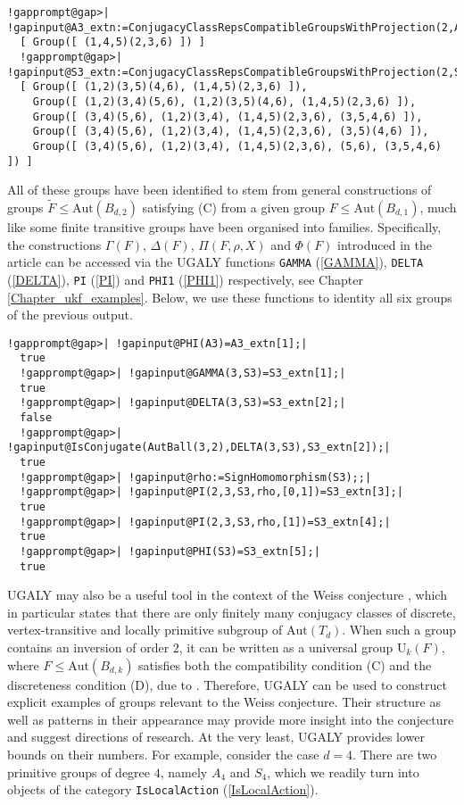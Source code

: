 \documentclass[a4paper,11pt]{report}
\begin{document}
{{ 
\begin{Verbatim}[commandchars=!@|,fontsize=\small,frame=single,label=Example]
  !gapprompt@gap>| !gapinput@A3_extn:=ConjugacyClassRepsCompatibleGroupsWithProjection(2,A3);|
  [ Group([ (1,4,5)(2,3,6) ]) ]
  !gapprompt@gap>| !gapinput@S3_extn:=ConjugacyClassRepsCompatibleGroupsWithProjection(2,S3);|
  [ Group([ (1,2)(3,5)(4,6), (1,4,5)(2,3,6) ]), 
    Group([ (1,2)(3,4)(5,6), (1,2)(3,5)(4,6), (1,4,5)(2,3,6) ]), 
    Group([ (3,4)(5,6), (1,2)(3,4), (1,4,5)(2,3,6), (3,5,4,6) ]), 
    Group([ (3,4)(5,6), (1,2)(3,4), (1,4,5)(2,3,6), (3,5)(4,6) ]), 
    Group([ (3,4)(5,6), (1,2)(3,4), (1,4,5)(2,3,6), (5,6), (3,5,4,6) ]) ]
\end{Verbatim}
 All of these groups have been identified to stem from general constructions of
groups $\widetilde{F}\le\mathrm{Aut}(B_{d,2})$ satisfying (C) from a given group $F\le\mathrm{Aut}(B_{d,1})$, much like some finite transitive groups have been organised into families.
Specifically, the constructions $\Gamma(F)$, $\Delta(F)$, $\Pi(F,\rho,X)$ and $\Phi(F)$ introduced in the article \cite[Section 3.4]{Tor20} can be accessed via the \textsf{UGALY} functions \texttt{GAMMA} (\ref{GAMMA}), \texttt{DELTA} (\ref{DELTA}), \texttt{PI} (\ref{PI}) and \texttt{PHI1} (\ref{PHI1}) respectively, see Chapter \ref{Chapter_ukf_examples}. Below, we use these functions to identity all six groups of the previous
output. 

 
\begin{Verbatim}[commandchars=!@|,fontsize=\small,frame=single,label=Example]
  !gapprompt@gap>| !gapinput@PHI(A3)=A3_extn[1];|
  true
  !gapprompt@gap>| !gapinput@GAMMA(3,S3)=S3_extn[1];|
  true
  !gapprompt@gap>| !gapinput@DELTA(3,S3)=S3_extn[2];|
  false
  !gapprompt@gap>| !gapinput@IsConjugate(AutBall(3,2),DELTA(3,S3),S3_extn[2]);|
  true
  !gapprompt@gap>| !gapinput@rho:=SignHomomorphism(S3);;|
  !gapprompt@gap>| !gapinput@PI(2,3,S3,rho,[0,1])=S3_extn[3];|
  true
  !gapprompt@gap>| !gapinput@PI(2,3,S3,rho,[1])=S3_extn[4];|
  true
  !gapprompt@gap>| !gapinput@PHI(S3)=S3_extn[5];|
  true
\end{Verbatim}
 \textsf{UGALY} may also be a useful tool in the context of the Weiss conjecture \cite{Wei78}, which in particular states that there are only finitely many conjugacy
classes of discrete, vertex-transitive and locally primitive subgroup of $\mathrm{Aut}(T_{d})$. When such a group contains an inversion of order $2$, it can be written as a universal group $\mathrm{U}_{k}(F)$, where $F\le\mathrm{Aut}(B_{d,k})$ satisfies both the compatibility condition (C) and the discreteness condition
(D), due to \cite[Corollary 4.38]{Tor20}. Therefore, \textsf{UGALY} can be used to construct explicit examples of groups relevant to the Weiss
conjecture. Their structure as well as patterns in their appearance may
provide more insight into the conjecture and suggest directions of research.
At the very least, \textsf{UGALY} provides lower bounds on their numbers. For example, consider the case $d=4$. There are two primitive groups of degree $4$, namely $A_{4}$ and $S_{4}$, which we readily turn into objects of the category \texttt{IsLocalAction} (\ref{IsLocalAction}). 

}}
\end{document}
